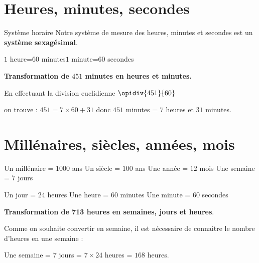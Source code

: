 \begin{pageCours} 

\section{Heures, minutes, secondes}

\begin{DefT}{Système horaire}
Notre système de mesure des heures, minutes et secondes est un \textbf{système sexagésimal}.
\begin{center}
 $1$ heure=$60$ minutes\hspace{1cm}$1$ minute=$60$ secondes 
\end{center}
\end{DefT}

\begin{Mt}
\textbf{Transformation de $451$ minutes en heures et minutes.}

En effectuant la division euclidienne
$\opidiv{451}{60}$

on trouve :
$451=7\times60+31$ donc $451$ minutes = $7$ heures et $31$ minutes.
\end{Mt}



\section{Millénaires, siècles, années, mois}

\begin{Def}
 Un millénaire = $1000$ ans \hspace{0.35cm} Un siècle = $100$ ans \hspace{0.35cm} Une année = $12$ mois  \hspace{0.35cm}  Une semaine = $7$ jours
\end{Def}

\begin{Def}
  Un jour = $24$ heures \hspace{0.5cm} Une heure = $60$ minutes\hspace{0.5cm} Une minute = $60$ secondes
\end{Def}

\begin{Mt}
\textbf{Transformation de 713 heures en semaines, jours et heures}.

Comme on souhaite convertir en semaine, il est nécessaire de connaitre le nombre d'heures en une semaine : 

Une semaine = 7 jours = $7\times 24$ heures = $168$ heures.


\end{Mt}
\end{pageCours}
